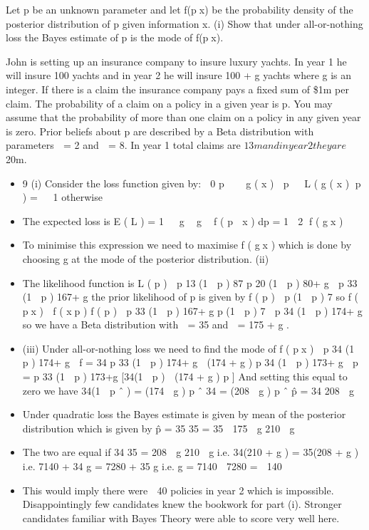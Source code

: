 \documentclass[a4paper,12pt]{article}
\begin{document}
Let p be an unknown parameter and let f(px) be the probability density of the
posterior distribution of p given information x.
(i)
Show that under all-or-nothing loss the Bayes estimate of p is the mode of
f(px).

\medskip

John is setting up an insurance company to insure luxury yachts. In year 1 he will
insure 100 yachts and in year 2 he will insure 100 + g yachts where g is an integer.
If there is a claim the insurance company pays a fixed sum of \$1m per claim.
The probability of a claim on a policy in a given year is p. You may assume that the
probability of more than one claim on a policy in any given year is zero. Prior beliefs
about p are described by a Beta distribution with parameters  = 2 and  = 8.
In year 1 total claims are $13m and in year 2 they are $20m.
\begin{itemize}
\item 9
(i)
Consider the loss function given by:
 0 p    g ( x )  p  
L ( g ( x ) p ) = 
 1 otherwise
\item The expected loss is
E ( L ) = 1  
g 
g 
f ( p  x ) dp
= 1  2 f ( gx )

 
\item To minimise this expression we need to maximise f ( gx ) which is done by
choosing g at the mode of the posterior distribution.
(ii)
\item The likelihood function is L ( p )  p 13 (1  p ) 87 p 20 (1  p ) 80+ g
 p 33 (1  p ) 167+ g
the prior likelihood of p is given by f ( p )  p (1  p ) 7
so f ( px )  f ( xp ) f ( p )
 p 33 (1  p ) 167+ g p (1  p ) 7
 p 34 (1  p ) 174+ g
so we have a Beta distribution with  = 35 and  = 175 + g .

\item (iii)
Under all-or-nothing loss we need to find the mode of
f ( px )  p 34 (1  p ) 174+ g
 f
= 34 p 33 (1  p ) 174+ g  (174 + g ) p 34 (1  p ) 173+ g
 p
= p 33 (1  p ) 173+g [34(1  p )  (174 + g ) p ]
And setting this equal to zero we have
34(1  p ˆ ) = (174  g ) p ˆ
34 = (208  g ) p ˆ
p̂ =
34
208  g
\item Under quadratic loss the Bayes estimate is given by mean of the posterior
distribution which is given by
p̂ =
35
35
=
35  175  g 210  g
\item The two are equal if
34
35
=
208  g
210  g
i.e. 34(210 + g ) = 35(208 + g )
i.e. 7140 + 34 g = 7280 + 35 g
i.e. g = 7140  7280 =  140
\item This would imply there were  40 policies in year 2 which is impossible. Disappointingly few candidates knew the bookwork for part (i). Stronger candidates familiar with Bayes Theory were able to score very well here.
\end{itemize}
\end{document}
